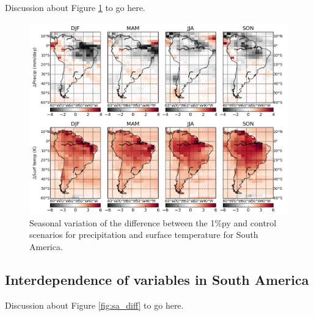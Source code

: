 \documentclass{article}
\begin{document}
Discussion about Figure \ref{fig:sa_seasonal} to go here.

\begin{figure}[hbp]
    \centering
    \includegraphics[width=\textwidth]{figures/sa_seasonal}
    \caption{Seasonal variation of the difference between the 1\%py and control scenarios for precipitation and surface temperature for South America.}
    \label{fig:sa_seasonal}
\end{figure}

\newpage

\subsection{Interdependence of variables in South America}

Discussion about Figure \ref{fig:sa_diff} to go here.
\end{document}
